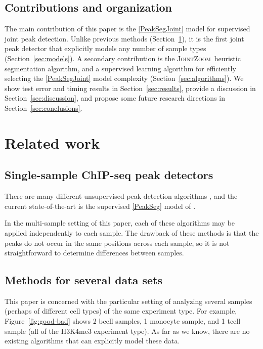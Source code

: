 \documentclass{article} %
\newcommand{\JointHeuristic}{\textsc{JointZoom}}
\begin{document}
\subsection{Contributions and organization}

The main contribution of this paper is the \ref{PeakSegJoint} model
for supervised joint peak detection. Unlike previous methods
(Section~\ref{sec:related}), it is the first joint peak detector that
explicitly models any number of sample types
(Section~\ref{sec:models}). A secondary contribution is the
\JointHeuristic\ heuristic segmentation algorithm, and a supervised
learning algorithm for efficiently selecting the \ref{PeakSegJoint}
model complexity (Section~\ref{sec:algorithms}).  We show test error
and timing results in Section~\ref{sec:results}, provide a discussion
in Section~\ref{sec:discussion}, and propose some future research
directions in Section~\ref{sec:conclusions}.

\section{Related work}
\label{sec:related}

\subsection{Single-sample ChIP-seq peak detectors}

There are many different unsupervised peak detection algorithms
\citep{evaluation2010, rye2010manually, chip-seq-bench}, and the
current state-of-the-art is the supervised \ref{PeakSeg} model of
\citet{HOCKING-PeakSeg}. 

In the multi-sample setting of this paper, each of these algorithms
may be applied independently to each sample. The drawback of these
methods is that the peaks do not occur in the same positions across
each sample, so it is not straightforward to determine differences
between samples.

\subsection{Methods for several data sets}

This paper is concerned with the particular setting of analyzing
several samples (perhaps of different cell types) of the same
experiment type. For example, Figure~\ref{fig:good-bad} shows 2 bcell
samples, 1 monocyte sample, and 1 tcell sample (all of the H3K4me3
experiment type). As far as we know, there are no existing algorithms
that can explicitly model these data.
\end{document}
